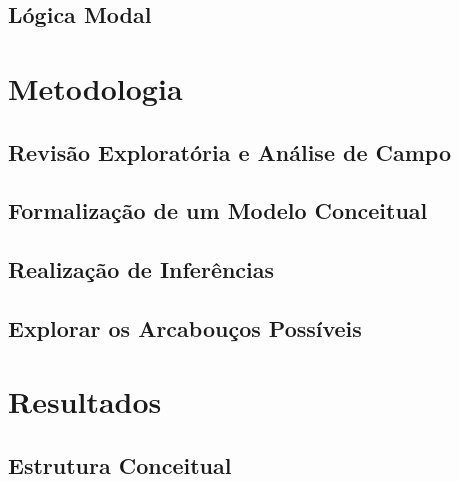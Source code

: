 \documentclass[openright]{normas-utf-tex} %
\begin{document}
	\section{Lógica Modal} \label{logic}

		


\chapter{Metodologia}
\label{chap:metod}

	

    \section{Revisão Exploratória e Análise de Campo} 
    
          
    
    \section{Formalização de um Modelo Conceitual} 
    
         
 
    \section{Realização de Inferências} 
    
        

    \section{Explorar os Arcabouços Possíveis} 
    
        


\chapter{Resultados}
\label{chap:resul}

	
	
	\section{Estrutura Conceitual}
\end{document}

